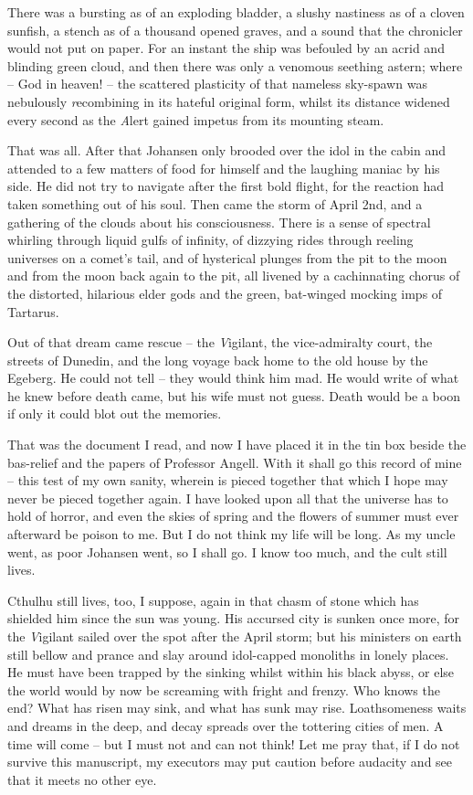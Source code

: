 There was a bursting as of an exploding bladder, a slushy nastiness as of a cloven sunfish, a stench as of a thousand opened graves, and a sound that the chronicler would not put on paper. For an instant the ship was befouled by an acrid and blinding green cloud, and then there was only a venomous seething astern; where⁠ – God in heaven!⁠ – the scattered plasticity of that nameless sky-spawn was nebulously {\emph recombining} in its hateful original form, whilst its distance widened every second as the {\emph Alert} gained impetus from its mounting steam.

\sectionbreak

That was all. After that Johansen only brooded over the idol in the cabin and attended to a few matters of food for himself and the laughing maniac by his side. He did not try to navigate after the first bold flight, for the reaction had taken something out of his soul. Then came the storm of April 2nd, and a gathering of the clouds about his consciousness. There is a sense of spectral whirling through liquid gulfs of infinity, of dizzying rides through reeling universes on a comet’s tail, and of hysterical plunges from the pit to the moon and from the moon back again to the pit, all livened by a cachinnating chorus of the distorted, hilarious elder gods and the green, bat-winged mocking imps of Tartarus.

Out of that dream came rescue⁠ – the {\emph Vigilant}, the vice-admiralty court, the streets of Dunedin, and the long voyage back home to the old house by the Egeberg. He could not tell⁠ – they would think him mad. He would write of what he knew before death came, but his wife must not guess. Death would be a boon if only it could blot out the memories.

That was the document I read, and now I have placed it in the tin box beside the bas-relief and the papers of Professor Angell. With it shall go this record of mine⁠ – this test of my own sanity, wherein is pieced together that which I hope may never be pieced together again. I have looked upon all that the universe has to hold of horror, and even the skies of spring and the flowers of summer must ever afterward be poison to me. But I do not think my life will be long. As my uncle went, as poor Johansen went, so I shall go. I know too much, and the cult still lives.

Cthulhu still lives, too, I suppose, again in that chasm of stone which has shielded him since the sun was young. His accursed city is sunken once more, for the {\emph Vigilant} sailed over the spot after the April storm; but his ministers on earth still bellow and prance and slay around idol-capped monoliths in lonely places. He must have been trapped by the sinking whilst within his black abyss, or else the world would by now be screaming with fright and frenzy. Who knows the end? What has risen may sink, and what has sunk may rise. Loathsomeness waits and dreams in the deep, and decay spreads over the tottering cities of men. A time will come⁠ – but I must not and can not think! Let me pray that, if I do not survive this manuscript, my executors may put caution before audacity and see that it meets no other eye.
\endchapter

\bye


